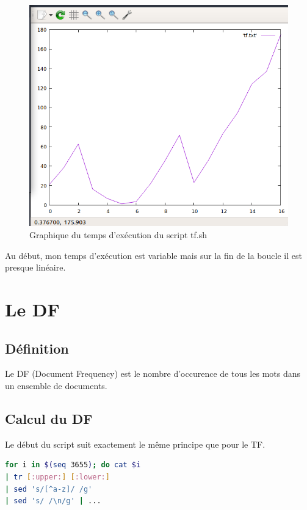 \documentclass{article}
\begin{document}
\begin{figure}[H]
\centering
\includegraphics[scale = 0.5]{"img/tf.png"}
\caption{Graphique du temps d'exécution du script tf.sh}
\end{figure}

Au début, mon temps d'exécution est variable mais sur la fin de la boucle il est presque linéaire.

\section{Le DF}

\subsection{Définition}

Le DF (Document Frequency) est le nombre d'occurence de tous les mots dans un ensemble de documents.

\subsection{Calcul du DF}

Le début du script suit exactement le même principe que pour le TF.

\begin{lstlisting}[language=bash,caption={Bouclage}]
for i in $(seq 3655); do cat $i 
| tr [:upper:] [:lower:]
| sed 's/[^a-z]/ /g' 
| sed 's/ /\n/g' | ...
\end{lstlisting}
\end{document}
